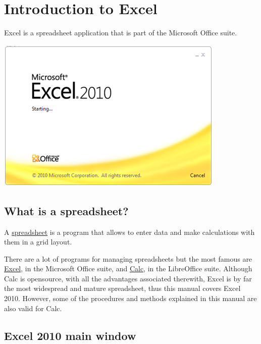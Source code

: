 
\chapter{Introduction to Excel}
Excel is a spreadsheet application that is part of the Microsoft Office suite.

\begin{center}
\includegraphics[scale=0.7]{../img/excel_splash.png}
\end{center}


\section{What is a spreadsheet?}\hypertarget{what-is-a-spreadsheet}{}\label{what-is-a-spreadsheet}

A \href{https://en.wikipedia.org/wiki/Spreadsheet}{spreadsheet} is a program that allows to enter data and make calculations with them in a grid layout.

There are a lot of programs for managing spreadsheets but the most famous are \href{https://products.office.com/en/excel}{Excel}, in the Microsoft Office suite, and \href{https://www.libreoffice.org/discover/calc}{Calc}, in the LibreOffice suite. Although Calc is opensource, with all the advantages associated therewith, Excel is by far the most widespread and mature spreadsheet, thus this manual covers Excel 2010. However, some of the procedures and methods explained in this manual are also valid for Calc.

\section{Excel 2010 main window}\hypertarget{excel-2010-main-window}{}\label{excel-2010-main-window}

